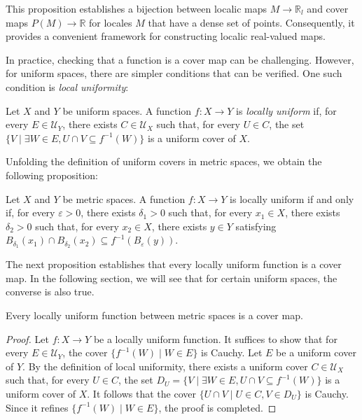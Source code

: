 \documentclass[reqno]{amsart}
\theoremstyle{definition}
\theoremstyle{remark}
\numberwithin{figure}{section}
\begin{document}
This proposition establishes a bijection between localic maps $M \to \mathbb{R}_l$ and cover maps $P(M) \to \mathbb{R}$ for locales $M$ that have a dense set of points.
Consequently, it provides a convenient framework for constructing localic real-valued maps.

In practice, checking that a function is a cover map can be challenging.
However, for uniform spaces, there are simpler conditions that can be verified.
One such condition is \emph{local uniformity}:

\begin{defn}
Let $X$ and $Y$ be uniform spaces.
A function $f : X \to Y$ is \emph{locally uniform} if, for every $E \in \mathcal{U}_Y$, there exists $C \in \mathcal{U}_X$ such that, for every $U \in C$, the set $\{ V \mid \exists W \in E, U \cap V \subseteq f^{-1}(W) \}$ is a uniform cover of $X$.
\end{defn}

Unfolding the definition of uniform covers in metric spaces, we obtain the following proposition:

\begin{prop}
Let $X$ and $Y$ be metric spaces.
A function $f : X \to Y$ is locally uniform if and only if, for every $\varepsilon > 0$, there exists $\delta_1 > 0$ such that,
for every $x_1 \in X$, there exists $\delta_2 > 0$ such that, for every $x_2 \in X$, there exists $y \in Y$ satisfying $B_{\delta_1}(x_1) \cap B_{\delta_2}(x_2) \subseteq f^{-1}(B_\varepsilon(y))$.
\end{prop}

The next proposition establishes that every locally uniform function is a cover map.
In the following section, we will see that for certain uniform spaces, the converse is also true.

\begin{prop}
Every locally uniform function between metric spaces is a cover map.
\end{prop}
\begin{proof}
Let $f : X \to Y$ be a locally uniform function.
It suffices to show that for every $E \in \mathcal{U}_Y$, the cover $\{ f^{-1}(W) \mid W \in E \}$ is Cauchy.
Let $E$ be a uniform cover of $Y$.
By the definition of local uniformity, there exists a uniform cover $C \in \mathcal{U}_X$ such that, for every $U \in C$, the set 
$D_U = \{ V \mid \exists W \in E, U \cap V \subseteq f^{-1}(W) \}$
is a uniform cover of $X$.
It follows that the cover $\{ U \cap V \mid U \in C, V \in D_U \}$ is Cauchy.
Since it refines $\{ f^{-1}(W) \mid W \in E \}$, the proof is completed.
\end{proof}
\end{document}
